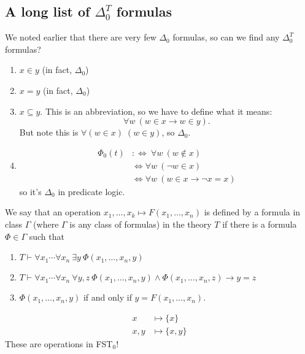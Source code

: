 \documentclass{article}
\begin{document}
\subsection{A long list of \texorpdfstring{$\Delta_0^T$}{Delta0T} formulas}
We noted earlier that there are very few \hyperlink{def:delta0}{$\Delta_0$} formulas, so can we find any \hyperlink{def:delta0t}{$\Delta_0^T$} formulas?
\begin{enumerate}
  \item $x \in y$ (in fact, \hyperlink{def:delta0}{$\Delta_0$})
  \item $x = y$ (in fact, $\Delta_0$)
  \item $x \subseteq y$. This is an abbreviation, so we have to define what it means:
    \begin{equation*}\forall w\ (w \in x \rightarrow w \in y).\end{equation*}
    But note this is $\forall (w \in x) \; (w \in y)$, so $\Delta_0$.
  \item
    \begin{align*}
      \Phi_0(t) &:\Longleftrightarrow\ \forall w\ (w \notin x) \\
                &\iff \forall w\ (\neg w \in x) \\
                &\iff \forall w \ (w \in x \rightarrow \neg x = x)
    \end{align*}
    so it's $\Delta_0$ in predicate logic.
\end{enumerate}
We say that an operation $x_1, \dotsc, x_k \mapsto F(x_1, \dotsc, x_n)$ is defined by a formula in class $\Gamma$ (where $\Gamma$ is any class of formulas) in the theory $T$ if there is a formula $\Phi \in \Gamma$ such that
\begin{enumerate}[label=(\arabic*)]
  \item $T \vdash \forall x_1 \dotsm \forall x_n \ \exists y \ \Phi (x_1, \dotsc, x_n, y)$
  \item $T \vdash \forall x_1 \dotsm \forall x_n \ \forall y,z \ \Phi(x_1, \dotsc, x_n, y) \land \Phi(x_1, \dotsc, x_n, z) \rightarrow y = z$
  \item $\Phi(x_1, \dotsc, x_n, y)$ if and only if $y = F(x_1, \dotsc, x_n)$.
\end{enumerate}
\begin{eg}
  \begin{align*}
    x &\mapsto \{x\} \\
    x,y &\mapsto \{x,y\}
  \end{align*}
  These are operations in \textsf{FST}$_0$!
\end{eg}
\end{document}
